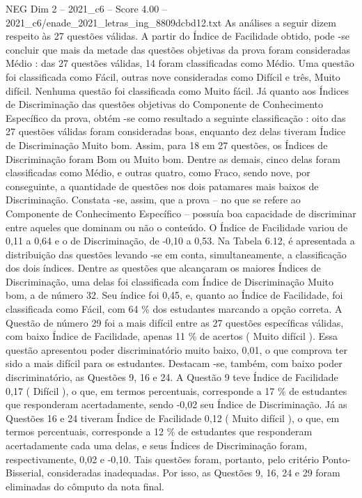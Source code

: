\begin{textsample}{NEG Dim 2 – 2021\_c6 – Score 4.00 – 2021\_c6/enade\_2021\_letras\_ing\_8809dcbd12.txt}
As análises a seguir dizem respeito às 27 questões válidas.
A partir do Índice de Facilidade obtido, pode -se concluir que mais da metade das questões objetivas da prova foram consideradas Médio : das 27 questões válidas, 14 foram classificadas como Médio.
Uma questão foi classificada como Fácil, outras nove consideradas como Difícil e três, Muito difícil.
Nenhuma questão foi classificada como Muito fácil.
Já quanto aos Índices de Discriminação das questões objetivas do Componente de Conhecimento Específico da prova, obtém -se como resultado a seguinte classificação : oito das 27 questões válidas foram consideradas boas, enquanto dez delas tiveram Índice de Discriminação Muito bom.
Assim, para 18 em 27 questões, os Índices de Discriminação foram Bom ou Muito bom.
Dentre as demais, cinco delas foram classificadas como Médio, e outras quatro, como Fraco, sendo nove, por conseguinte, a quantidade de questões nos dois patamares mais baixos de Discriminação.
Constata -se, assim, que a prova – no que se refere ao Componente de Conhecimento Específico – possuía boa capacidade de discriminar entre aqueles que dominam ou não o conteúdo.
O Índice de Facilidade variou de 0,11 a 0,64 e o de Discriminação, de -0,10 a 0,53.
Na Tabela 6.12, é apresentada a distribuição das questões levando -se em conta, simultaneamente, a classificação dos dois índices.
Dentre as questões que alcançaram os maiores Índices de Discriminação, uma delas foi classificada com Índice de Discriminação Muito bom, a de número 32.
Seu índice foi 0,45, e, quanto ao Índice de Facilidade, foi classificada como Fácil, com 64 \% dos estudantes marcando a opção correta.
A Questão de número 29 foi a mais difícil entre as 27 questões específicas válidas, com baixo Índice de Facilidade, apenas 11 \% de acertos ( Muito difícil ).
Essa questão apresentou poder discriminatório muito baixo, 0,01, o que comprova ter sido a mais difícil para os estudantes.
Destacam -se, também, com baixo poder discriminatório, as Questões 9, 16 e 24.
A Questão 9 teve Índice de Facilidade 0,17 ( Difícil ), o que, em termos percentuais, corresponde a 17 \% de estudantes que responderam acertadamente, sendo -0,02 seu Índice de Discriminação.
Já as Questões 16 e 24 tiveram Índice de Facilidade 0,12 ( Muito difícil ), o que, em termos percentuais, corresponde a 12 \% de estudantes que responderam acertadamente cada uma delas, e seus Índices de Discriminação foram, respectivamente, 0,02 e -0,10.
Tais questões foram, portanto, pelo critério Ponto-Bisserial, consideradas inadequadas.
Por isso, as Questões 9, 16, 24 e 29 foram eliminadas do cômputo da nota final.

\end{textsample}
